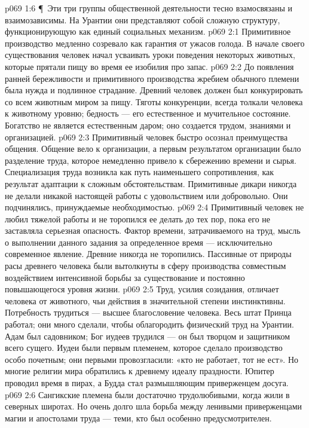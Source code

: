 \vs p069 1:6 \P\ Эти три группы общественной деятельности тесно взамосвязаны и взаимозависимы. На Урантии они представляют собой сложную структуру, функционирующую как единый социальных механизм.
\vs p069 2:1 Примитивное производство медленно созревало как гарантия от ужасов голода. В начале своего существования человек начал усваивать уроки поведения некоторых животных, которые прятали пищу во время ее изобилия про запас.
\vs p069 2:2 До появления ранней бережливости и примитивного производства жребием обычного племени была нужда и подлинное страдание. Древний человек должен был конкурировать со всем животным миром за пищу. Тяготы конкуренции, всегда толкали человека к животному уровню; бедность --- его естественное и мучительное состояние. Богатство не является естественным даром; оно создается трудом, знаниями и организацией.
\vs p069 2:3 Примитивный человек быстро осознал преимущества общения. Общение вело к организации, а первым результатом организации было разделение труда, которое немедленно привело к сбережению времени и сырья. Специализация труда возникла как путь наименьшего сопротивления, как результат адаптации к сложным обстоятельствам. Примитивные дикари никогда не делали никакой настоящей работы с удовольствием или добровольно. Они подчинялись, принуждаемые необходимостью.
\vs p069 2:4 Примитивный человек не любил тяжелой работы и не торопился ее делать до тех пор, пока его не заставляла серьезная опасность. Фактор времени, затрачиваемого на труд, мысль о выполнении данного задания за определенное время --- исключительно современное явление. Древние никогда не торопились. Пассивные от природы расы древнего человека были вытолкнуты в сферу производства совместным воздействием интенсивной борьбы за существование и постоянно повышающегося уровня жизни.
\vs p069 2:5 Труд, усилия созидания, отличает человека от животного, чьи действия в значительной степени инстинктивны. Потребность трудиться --- высшее благословение человека. Весь штат Принца работал; они много сделали, чтобы облагородить физический труд на Урантии. Адам был садовником; Бог иудеев трудился --- он был творцом и защитником всего сущего. Иудеи были первым племенем, которое сделало производство особо почетным; они первыми провозгласили: «кто не работает, тот не ест». Но многие религии мира обратились к древнему идеалу праздности. Юпитер проводил время в пирах, а Будда стал размышляющим приверженцем досуга.
\vs p069 2:6 Сангикские племена были достаточно трудолюбивыми, когда жили в северных широтах. Но очень долго шла борьба между ленивыми приверженцами магии и апостолами труда --- теми, кто был особенно предусмотрителен.
